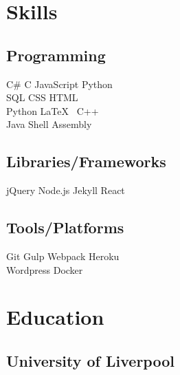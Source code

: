 \documentclass[]{CV}
\begin{document}
\hfill
\begin{minipage}[t]{0.25\textwidth} 


\section{Skills}
\subsection{Programming}
\sectionsep
{}
C\# \textbullet{} C \textbullet{} JavaScript \textbullet{} Python    \\ SQL \textbullet{} CSS \textbullet{} HTML \textbullet{} \\
\sectionsep
{}
Python \textbullet{} \LaTeX\ \textbullet{}  C++  \\
\sectionsep
{}
Java \textbullet{}  Shell \textbullet{} Assembly \\
\sectionsep
\sectionsep
\subsection{Libraries/Frameworks}
\sectionsep
jQuery \textbullet{} Node.js \textbullet{} Jekyll \textbullet{} React \\
\sectionsep
\sectionsep
\subsection{Tools/Platforms}
\sectionsep
Git \textbullet{} Gulp \textbullet{} Webpack \textbullet{} Heroku    \\ Wordpress \textbullet{} Docker \\

\sectionsep


\section{Education} 
\subsection{University of Liverpool}


\end{minipage}
\end{document}
